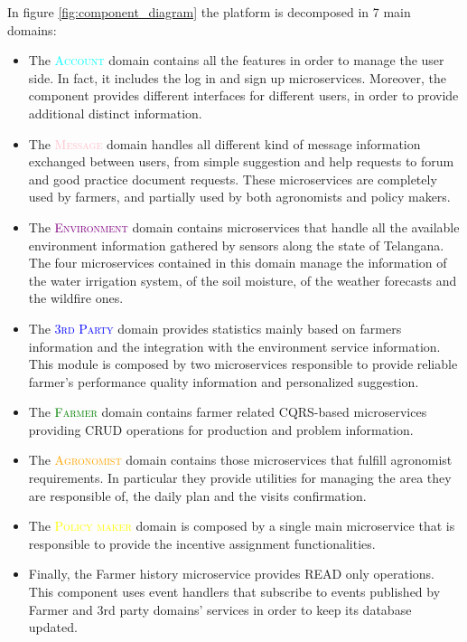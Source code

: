 In figure \ref{fig:component_diagram} the platform is decomposed in 7 main domains:
\begin{itemize}
    \item The \textsc{\textcolor{cyan}{Account}} domain contains all the features in order to manage the user side. In fact, it includes the log in and sign up microservices. Moreover, the component provides different interfaces for different users, in order to provide additional distinct information.
    \item The \textsc{\textcolor{pink}{Message}} domain handles all different kind of message information exchanged between users, from simple suggestion and help requests to forum and good practice document requests. These microservices are completely used by farmers, and partially used by both agronomists and policy makers.
    \item The \textsc{\textcolor{purple}{Environment}} domain contains microservices that handle all the available environment information gathered by sensors along the state of Telangana. The four microservices contained in this domain manage the information of the water irrigation system, of the soil moisture, of the weather forecasts and the wildfire ones.
    \item The \textsc{\textcolor{blue}{3rd Party}} domain provides statistics mainly based on farmers information and the integration with the environment service information. This module is composed by two microservices responsible to provide reliable farmer's performance quality information and personalized suggestion.
    \item The \textsc{\textcolor{green}{Farmer}} domain contains farmer related CQRS-based microservices providing CRUD operations for production and problem information.
    \item The \textsc{\textcolor{orange}{Agronomist}} domain contains those microservices that fulfill agronomist requirements. In particular they provide utilities for managing the area they are responsible of, the daily plan and the visits confirmation.
    \item The \textsc{\textcolor{yellow}{Policy maker}} domain is composed by a single main microservice that is responsible to provide the incentive assignment functionalities.
    \item Finally, the Farmer history microservice provides READ only operations. This component uses event handlers that subscribe to events published by Farmer and 3rd party domains' services in order to keep its database updated.
\end{itemize}



